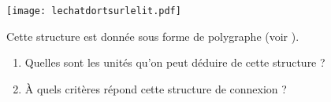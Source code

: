 {    \begin{center}
    \texttt{[image: lechatdortsurlelit.pdf]}
    \end{center}

    Cette structure est donnée sous forme de polygraphe (voir ).
    
    \begin{enumerate}[label=\alph*.]
    \item Quelles sont les unités qu’on peut déduire de cette structure ?
    \item À quels critères répond cette structure de connexion ?
    \end{enumerate} 
}
